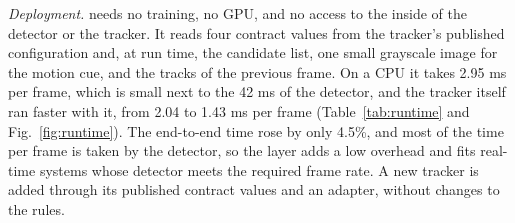 \emph{Deployment.} \scl{} needs no training, no GPU, and no access to the inside of the detector or
the tracker. It reads four contract values from the tracker's published configuration and, at run
time, the candidate list, one small grayscale image for the motion cue, and the tracks of the
previous frame. On a CPU it takes 2.95 ms per frame, which is small next to the 42 ms of the
detector, and the tracker itself ran faster with it, from 2.04 to 1.43 ms per frame
(Table~\ref{tab:runtime} and Fig.~\ref{fig:runtime}). The end-to-end time rose by only 4.5\%, and
most of the time per frame is taken by the detector, so the layer adds a low overhead and fits
real-time systems whose detector meets the required frame rate. A new tracker is added through its published
contract values and an adapter, without changes to the rules.
